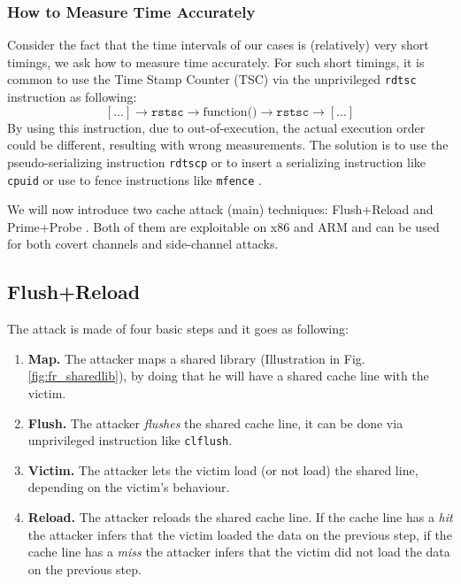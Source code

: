 \subsubsection{How to Measure Time Accurately}
Consider the fact that the time intervals of our cases is (relatively) very short timings, we ask how to measure time accurately. For such short timings, it is common to use the Time Stamp Counter (TSC) via the unprivileged \texttt{rdtsc} instruction as following:
$$[...] \rightarrow \texttt{rstsc} \rightarrow \mbox{function()} \rightarrow \texttt{rstsc} \rightarrow [...]$$
\noindent By using this instruction, due to out-of-execution, the actual execution order could be different, resulting with wrong measurements. The solution is to use the pseudo-serializing instruction \texttt{rdtscp} or to insert a serializing instruction like \texttt{cpuid} or use to fence instructions like \texttt{mfence} \cite{benchmark2010}.

We will now introduce two cache attack (main) techniques: Flush+Reload \cite{Gullasch:2011:CGB:2006077.2006784, Osvik:2006:CAC:2117739.2117741, Yarom2014} and Prime+Probe \cite{Percival2009,Osvik:2006:CAC:2117739.2117741,Liu:2015:LCS:2867539.2867673}. Both of them are exploitable on x86 and ARM and can be used for both covert channels and side-channel attacks.
\subsection{Flush+Reload}
\label{sec:flushreload}
The attack is made of four basic steps and it goes as following:
\begin{enumerate}
    \item \textbf{Map. } The attacker maps a shared library (Illustration in Fig. \ref{fig:fr_sharedlib}), by doing that he will have a shared cache line with the victim.
    \item \textbf{Flush.} The attacker \textit{flushes} the shared cache line, it can be done via unprivileged instruction like \texttt{clflush}.
    \item \textbf{Victim.} The attacker lets the victim load (or not load) the shared line, depending on the victim's behaviour.
    \item \textbf{Reload.} The attacker reloads the shared cache line. If the cache line has a \textit{hit} the attacker infers that the victim loaded the data on the previous step, if the cache line has a \textit{miss} the attacker infers that the victim did not load the data on the previous step.
\end{enumerate}

